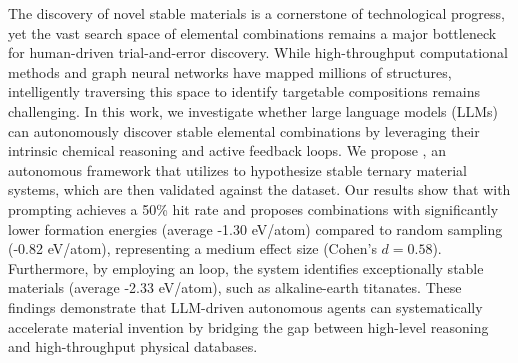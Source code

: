 The discovery of novel stable materials is a cornerstone of technological progress, yet the vast search space of elemental combinations remains a major bottleneck for human-driven trial-and-error discovery. While high-throughput computational methods and graph neural networks have mapped millions of structures, intelligently traversing this space to identify targetable compositions remains challenging. In this work, we investigate whether large language models (LLMs) can autonomously discover stable elemental combinations by leveraging their intrinsic chemical reasoning and active feedback loops. We propose \ours, an autonomous framework that utilizes \gpt to hypothesize stable ternary material systems, which are then validated against the \gnome dataset. Our results show that \ours with \zeroshot prompting achieves a 50\% hit rate and proposes combinations with significantly lower formation energies (average -1.30 eV/atom) compared to random sampling (-0.82 eV/atom), representing a medium effect size (Cohen's $d = 0.58$). Furthermore, by employing an \activelearning loop, the system identifies exceptionally stable materials (average -2.33 eV/atom), such as alkaline-earth titanates. These findings demonstrate that LLM-driven autonomous agents can systematically accelerate material invention by bridging the gap between high-level reasoning and high-throughput physical databases.
